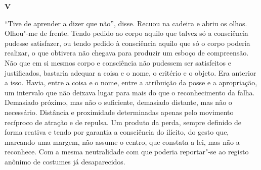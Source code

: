 \vspace*{1.8cm}
\noindent{}\textbf{V}

\bigskip

``Tive de aprender a dizer que não'',
disse. Recuou na cadeira e abriu os olhos. Olhou"-me de frente. Tendo
pedido ao corpo aquilo que talvez só a consciência pudesse satisfazer,
ou tendo pedido à consciência aquilo que só o corpo poderia realizar, o
que obtivera não chegava para produzir um esboço de compreensão. Não que
em si mesmos corpo e consciência não pudessem ser satisfeitos e
justificados, bastaria adequar a coisa e o nome, o critério e o objeto.
Era anterior a isso. Havia, entre a coisa e o nome, entre a atribuição
da posse e a apropriação, um intervalo que não deixava lugar para mais
do que o reconhecimento da falha. Demasiado próximo, mas não o
suficiente, demasiado distante, mas não o necessário. Distância e
proximidade determinadas apenas pelo movimento recíproco de atração e
de repulsa. Um produto da perda, sempre definido de forma reativa e
tendo por garantia a consciência do ilícito, do gesto que, marcando uma
margem, não assume o centro, que constata a lei, mas não a reconhece.
Com a mesma neutralidade com que poderia reportar"-se ao registo anônimo
de costumes já desaparecidos.

